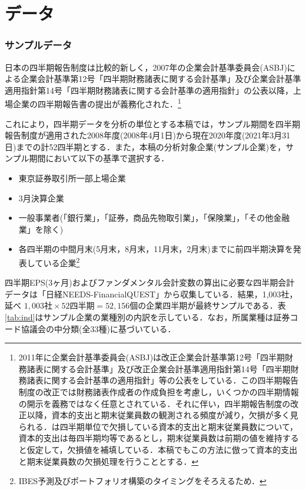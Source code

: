 \documentclass[a4paper，11pt]{jsarticle}
\begin{document}
\part{データ} \label{par:data}

\section{サンプルデータ} \label{sec:sample}

日本の四半期報告制度は比較的新しく，2007年の企業会計基準委員会(ASBJ)による企業会計基準第12号「四半期財務諸表に関する会計基準」及び企業会計基準適用指針第14号「四半期財務諸表に関する会計基準の適用指針」の公表以降，上場企業の四半期報告書の提出が義務化された．\footnote{2011年に企業会計基準委員会(ASBJ)は改正企業会計基準第12号「四半期財務諸表に関する会計基準」及び改正企業会計基準適用指針第14号「四半期財務諸表に関する会計基準の適用指針」等の公表をしている．この四半期報告制度の改正では財務諸表作成者の作成負担を考慮し，いくつかの四半期情報の開示を義務ではなく任意とされている．それに伴い，四半期報告制度の改正以降，資本的支出と期末従業員数の観測される頻度が減り，欠損が多く見られる．\cite{zhang2004neural}は四半期単位で欠損している資本的支出と期末従業員数について，資本的支出は毎四半期均等であるとし，期末従業員数は前期の値を維持すると仮定して，欠損値を補填している．本稿でもこの方法に倣って資本的支出と期末従業員数の欠損処理を行うこととする．}

これにより，四半期データを分析の単位とする本稿では，サンプル期間を四半期報告制度が適用された2008年度(2008年4月1日)から現在2020年度(2021年3月31日)までの計52四半期とする．また，本稿の分析対象企業(サンプル企業)を，サンプル期間において以下の基準で選択する．

\begin{itemize}
  \item 東京証券取引所一部上場企業
  \item 3月決算企業
  \item 一般事業者(「銀行業」，「証券，商品先物取引業」，「保険業」，「その他金融業」を除く)
  \item 各四半期の中間月末(5月末，8月末，11月末，2月末)までに前四半期決算を発表している企業\footnote{IBES予測及びポートフォリオ構築のタイミングをそろえるため．}
\end{itemize}

四半期EPS(3ヶ月)およびファンダメンタル会計変数の算出に必要な四半期会計データは「日経NEEDS-FinancialQUEST」から収集している．結果，1,003社，延べ $1,003社 \times 52四半期 = 52,156個$の企業四半期が最終サンプルである．表\ref{tab:ind}はサンプル企業の業種別の内訳を示している．なお，所属業種は証券コード協議会の中分類(全33種)に基づいている．
\end{document}
